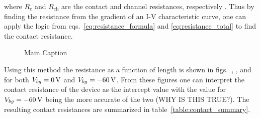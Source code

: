 where $R_\mathrm{c}$ and $R_\mathrm{ch}$ are the contact and channel resistances, respectively \cite{Schroder_Semiconductor2006}. Thus by finding the resistance from the gradient of an I-V characteristic curve, one can apply the logic from eqs.~\ref{eq:resistance_formula} and \ref{eq:resistance_total} to find the contact resistance.
\begin{figure}[ht]
	\centering
	\qquad
	\qquad
	\caption[Contact resistance of $0.05\%$  doped  channel device]{Main Caption}
	\label{fig:tlm_reistance_measurement}
\end{figure}
Using this method the resistance as a function of length is shown in figs.~, , and  for both $V_{bg} = 0\,\mathrm{V}$ and $V_{bg} = -60\,\mathrm{V}$. From these figures one can interpret the contact resistance of the device as the intercept value with the value for $V_{bg} = -60\,\mathrm{V}$ being the more accurate of the two (WHY IS THIS TRUE?). The resulting contact resistances are summarized in table~\ref{table:contact_summary}.
